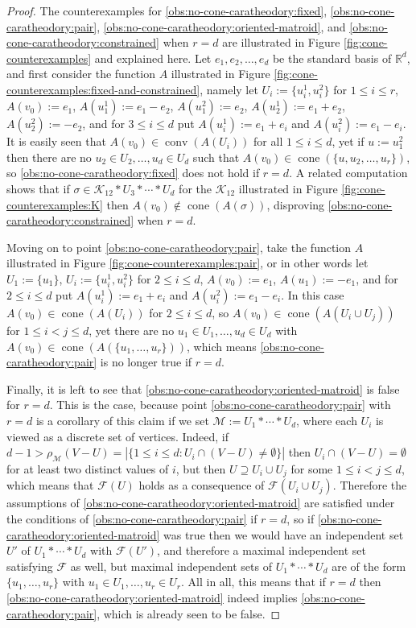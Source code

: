 \documentclass[a4paper,11pt,reqno, english]{amsart}
\theoremstyle{definition}
\theoremstyle{remark}
\newcommand\R{\mathbb R}
\DeclareMathOperator{\cone}{\mathrm{cone}}
\DeclareMathOperator{\conv}{\mathrm{conv}}
\begin{document}
\begin{proof}
    The counterexamples for \ref{obs:no-cone-caratheodory:fixed}, \ref{obs:no-cone-caratheodory:pair}, \ref{obs:no-cone-caratheodory:oriented-matroid}, and \ref{obs:no-cone-caratheodory:constrained} when $r=d$ are illustrated in Figure \ref{fig:cone-counterexamples} and explained here. Let $e_1,e_2,\ldots,e_d$ be the standard basis of $\R^d$, and first consider the function $A$ illustrated in Figure \ref{fig:cone-counterexamples:fixed-and-constrained}, namely let $U_i:=\{u_i^1,u_i^2\}$ for $1\leq i\leq r$, $A(v_0):=e_1$, $A(u_1^1):=e_1-e_2$, $A(u_1^2):=e_2$, $A(u_2^1):=e_1+e_2$, $A(u_2^2):=-e_2$, and for $3\leq i\leq d$ put $A(u_i^1):=e_1+e_i$ and $A(u_i^2):=e_1-e_i$. It is easily seen that $A(v_0)\in\conv(A(U_i))$ for all $1\leq i\leq d$, yet if $u:=u_1^2$ then there are no $u_2\in U_2,\ldots,u_d\in U_d$ such that $A(v_0)\in\cone(\{u,u_2,\ldots,u_r\})$, so \ref{obs:no-cone-caratheodory:fixed} does not hold if $r=d$. A related computation shows that if $\sigma\in\mathscr{K}_{12}*U_3*\cdots*U_d$ for the $\mathscr{K}_{12}$ illustrated in Figure \ref{fig:cone-counterexamples:K} then $A(v_0)\notin\cone(A(\sigma))$, disproving \ref{obs:no-cone-caratheodory:constrained} when $r=d$. 

    Moving on to point \ref{obs:no-cone-caratheodory:pair}, take the function $A$ illustrated in Figure \ref{fig:cone-counterexamples:pair}, or in other words let $U_1:=\{u_1\}$, $U_i:=\{u_i^1,u_i^2\}$ for $2\leq i\leq d$, $A(v_0):=e_1$, $A(u_1):=-e_1$, and for $2\leq i\leq d$ put $A(u_i^1):=e_1+e_i$ and $A(u_i^2):=e_1-e_i$. In this case $A(v_0)\in\cone(A(U_i))$ for $2\leq i\leq d$, so $A(v_0)\in\cone(A(U_i\cup U_j))$ for $1\leq i<j\leq d$, yet there are no $u_1\in U_1,\ldots,u_d\in U_d$ with $A(v_0)\in\cone(A(\{u_1,\ldots,u_r\}))$, which means \ref{obs:no-cone-caratheodory:pair} is no longer true if $r=d$.

    Finally, it is left to see that \ref{obs:no-cone-caratheodory:oriented-matroid} is false for $r=d$. This is the case, because point \ref{obs:no-cone-caratheodory:pair} with $r=d$ is a corollary of this claim if we set $\mathscr{M}:=U_1*\cdots*U_d$, where each $U_i$ is viewed as a discrete set of vertices. Indeed, if $d-1>\rho_\mathscr{M}(V-U)=|\{1\leq i\leq d: U_i\cap (V-U)\neq\emptyset\}|$ then $U_i\cap(V-U)=\emptyset$ for at least two distinct values of $i$, but then $U\supseteq U_i\cup U_j$ for some $1\leq i< j\leq d$, which means that $\mathcal{F}(U)$ holds as a consequence of $\mathcal{F}(U_i\cup U_j)$. Therefore the assumptions of \ref{obs:no-cone-caratheodory:oriented-matroid} are satisfied under the conditions of \ref{obs:no-cone-caratheodory:pair} if $r=d$, so if \ref{obs:no-cone-caratheodory:oriented-matroid} was true then we would have an independent set $U'$ of $U_1*\cdots*U_d$ with $\mathcal{F}(U')$, and therefore a maximal independent set satisfying $\mathcal{F}$ as well, but maximal independent sets of $U_1*\cdots*U_d$ are of the form $\{u_1,\ldots,u_r\}$ with $u_1\in U_1,\ldots,u_r\in U_r$. All in all, this means that if $r=d$ then \ref{obs:no-cone-caratheodory:oriented-matroid} indeed implies \ref{obs:no-cone-caratheodory:pair}, which is already seen to be false.
\end{proof}
\end{document}
